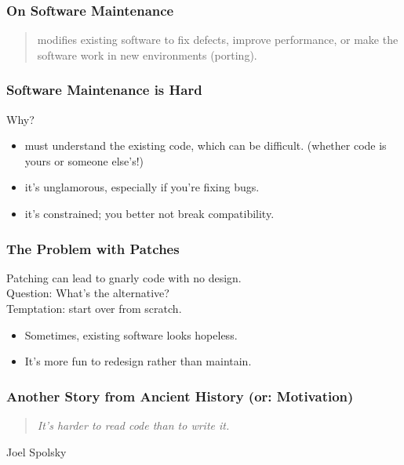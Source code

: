 \begin{frame}
\frametitle{On Software Maintenance}
\begin{changemargin}{1cm}

\begin{quote}
 modifies existing software to fix defects,
improve performance, or make the software work in new environments
(porting).
\end{quote}

\end{changemargin}
\end{frame}

\begin{frame}
\frametitle{Software Maintenance is Hard}
\begin{changemargin}{1cm}

Why?
\begin{itemize}
\item must understand the existing code,
which can be difficult. (whether code is yours or someone else's!)
\item it's unglamorous, especially if you're fixing bugs.
\item it's constrained; you better not break compatibility.
\end{itemize}

\end{changemargin}
\end{frame}

\begin{frame}
\frametitle{The Problem with Patches}
\begin{changemargin}{1cm}

Patching can lead to gnarly code with no
design. \\

Question: What's the alternative?\\[2em]

Temptation: start over from scratch.
\begin{itemize}
\item Sometimes,  existing software looks hopeless.
\item It's more fun to redesign
rather than maintain.
\end{itemize}

\end{changemargin}
\end{frame}

\begin{frame}
\frametitle{Another Story from Ancient History (or: Motivation)}
\begin{changemargin}{1cm}

\begin{quote}
	\emph{It's harder to read code than to write it.}
\end{quote}
	\hfill Joel Spolsky


\end{changemargin}
\end{frame}



